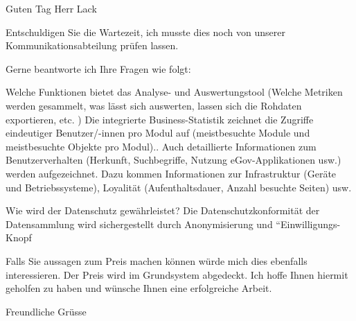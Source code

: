 \label{appendix:emailiweb}

Guten Tag Herr Lack

Entschuldigen Sie die Wartezeit, ich musste dies noch von unserer Kommunikationsabteilung prüfen lassen.

Gerne beantworte ich Ihre Fragen wie folgt:

Welche Funktionen bietet das Analyse- und Auswertungstool (Welche Metriken werden gesammelt, was lässt sich auswerten, lassen sich die Rohdaten exportieren, etc. )
Die integrierte Business-Statistik zeichnet die Zugriffe eindeutiger Benutzer/-innen pro Modul auf (meistbesuchte Module und meistbesuchte Objekte pro Modul).. Auch detaillierte Informationen zum Benutzerverhalten (Herkunft, Suchbegriffe, Nutzung eGov-Applikationen usw.) werden aufgezeichnet. Dazu kommen Informationen zur Infrastruktur (Geräte und Betriebssysteme), Loyalität (Aufenthaltsdauer, Anzahl besuchte Seiten) usw.

Wie wird der Datenschutz gewährleistet?
Die Datenschutzkonformität der Datensammlung wird sichergestellt durch Anonymisierung und “Einwilligungs-Knopf

Falls Sie aussagen zum Preis machen können würde mich dies ebenfalls interessieren.
Der Preis wird im Grundsystem abgedeckt.
Ich hoffe Ihnen hiermit geholfen zu haben und wünsche Ihnen eine erfolgreiche Arbeit.

Freundliche Grüsse
